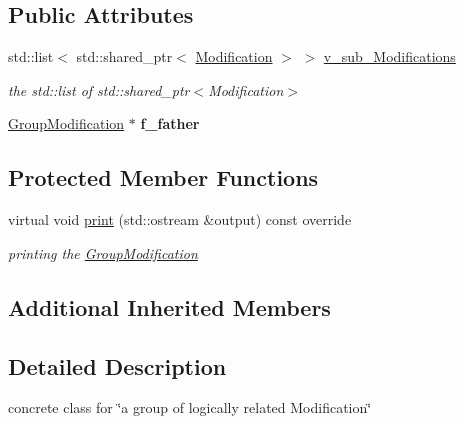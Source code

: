 \subsection*{Public Attributes}
\begin{DoxyCompactItemize}
\item 
\mbox{\label{class_s_m_spp__di__unipi__it_1_1_group_modification_a4f27617d2d3ed0dbfc4885660b2c80ca}} 
std\+::list$<$ std\+::shared\+\_\+ptr$<$ \mbox{\hyperlink{class_s_m_spp__di__unipi__it_1_1_modification}{Modification}} $>$ $>$ \mbox{\hyperlink{class_s_m_spp__di__unipi__it_1_1_group_modification_a4f27617d2d3ed0dbfc4885660b2c80ca}{v\+\_\+sub\+\_\+\+Modifications}}
\begin{DoxyCompactList}\small\item\em the std\+::list of std\+::shared\+\_\+ptr$<$\+Modification$>$ \end{DoxyCompactList}\item 
\mbox{\label{class_s_m_spp__di__unipi__it_1_1_group_modification_a827537a991c85ad7061a572f40b66fce}} 
\mbox{\hyperlink{class_s_m_spp__di__unipi__it_1_1_group_modification}{Group\+Modification}} $\ast$ {\bfseries f\+\_\+father}
\end{DoxyCompactItemize}
\subsection*{Protected Member Functions}
\begin{DoxyCompactItemize}
\item 
virtual void \mbox{\hyperlink{class_s_m_spp__di__unipi__it_1_1_group_modification_a59a9fcbf8f9f86d348344b2073644b0e}{print}} (std\+::ostream \&output) const override
\begin{DoxyCompactList}\small\item\em printing the \mbox{\hyperlink{class_s_m_spp__di__unipi__it_1_1_group_modification}{Group\+Modification}} \end{DoxyCompactList}\end{DoxyCompactItemize}
\subsection*{Additional Inherited Members}


\subsection{Detailed Description}
concrete class for \char`\"{}a group of logically related Modification\char`\"{} 

